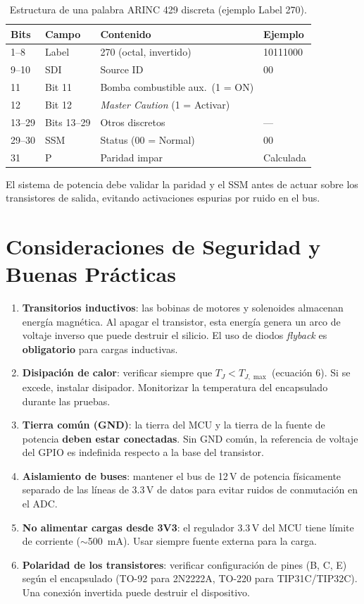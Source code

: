 \documentclass[11pt]{article}
\begin{document}
\begin{table}[H]\centering
\caption{Estructura de una palabra ARINC 429 discreta (ejemplo Label 270).}
\begin{tabular}{llll}
\toprule
Bits & Campo & Contenido & Ejemplo \\
\midrule
1--8 & Label & 270 (octal, invertido) & 10111000 \\
9--10 & SDI & Source ID & 00 \\
11 & Bit 11 & Bomba combustible aux.\ (1 = ON) & \\
12 & Bit 12 & \emph{Master Caution} (1 = Activar) & \\
13--29 & Bits 13--29 & Otros discretos & --- \\
29--30 & SSM & Status (00 = Normal) & 00 \\
31 & P & Paridad impar & Calculada \\
\bottomrule
\end{tabular}
\end{table}
El sistema de potencia debe validar la paridad y el SSM antes de actuar sobre los
transistores de salida, evitando activaciones espurias por ruido en el bus.

\section{Consideraciones de Seguridad y Buenas Prácticas}
\begin{enumerate}
  \item \textbf{Transitorios inductivos}: las bobinas de motores y solenoides almacenan
        energía magnética. Al apagar el transistor, esta energía genera un arco de
        voltaje inverso que puede destruir el silicio. El uso de diodos \emph{flyback}
        es \textbf{obligatorio} para cargas inductivas.
  \item \textbf{Disipación de calor}: verificar siempre que $T_J < T_{J,\max}$
        (ecuación 6). Si se excede, instalar disipador. Monitorizar la temperatura del
        encapsulado durante las pruebas.
  \item \textbf{Tierra común (GND)}: la tierra del MCU y la tierra de la fuente de
        potencia \textbf{deben estar conectadas}. Sin GND común, la referencia de
        voltaje del GPIO es indefinida respecto a la base del transistor.
  \item \textbf{Aislamiento de buses}: mantener el bus de 12\,V de potencia físicamente
        separado de las líneas de 3.3\,V de datos para evitar ruidos de conmutación en
        el ADC.
  \item \textbf{No alimentar cargas desde 3V3}: el regulador 3.3\,V del MCU tiene límite
        de corriente ($\sim$\SI{500}{\milli\ampere}). Usar siempre fuente externa para
        la carga.
  \item \textbf{Polaridad de los transistores}: verificar configuración de pines (B, C,
        E) según el encapsulado (TO-92 para 2N2222A, TO-220 para TIP31C/TIP32C). Una
        conexión invertida puede destruir el dispositivo.
\end{enumerate}
\end{document}
